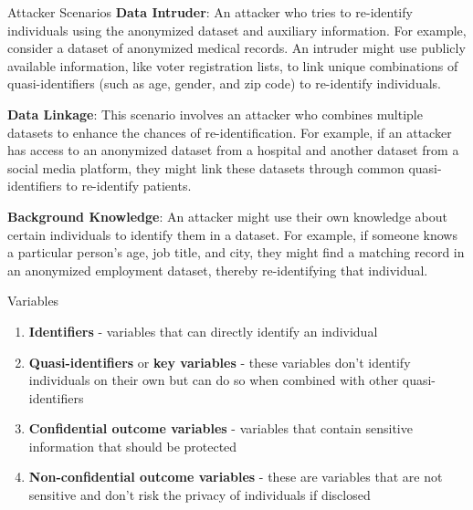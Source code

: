 \documentclass[
  ignorenonframetext,
  aspectratio=169,
]{beamer}
\begin{document}
\begin{frame}{Attacker Scenarios}
\label{attacker-scenarios}
\textbf{Data Intruder}: An attacker who tries to re-identify individuals
using the anonymized dataset and auxiliary information. For example,
consider a dataset of anonymized medical records. An intruder might use
publicly available information, like voter registration lists, to link
unique combinations of quasi-identifiers (such as age, gender, and zip
code) to re-identify individuals.

\textbf{Data Linkage}: This scenario involves an attacker who combines
multiple datasets to enhance the chances of re-identification. For
example, if an attacker has access to an anonymized dataset from a
hospital and another dataset from a social media platform, they might
link these datasets through common quasi-identifiers to re-identify
patients.

\textbf{Background Knowledge}: An attacker might use their own knowledge
about certain individuals to identify them in a dataset. For example, if
someone knows a particular person's age, job title, and city, they might
find a matching record in an anonymized employment dataset, thereby
re-identifying that individual.
\end{frame}

\begin{frame}{Variables}
\label{variables}
\begin{enumerate}
\item
  \textbf{Identifiers} - variables that can directly identify an
  individual
\item
  \textbf{Quasi-identifiers} or \textbf{key variables} - these variables
  don't identify individuals on their own but can do so when combined
  with other quasi-identifiers
\item
  \textbf{Confidential outcome variables} - variables that contain
  sensitive information that should be protected
\item
  \textbf{Non-confidential outcome variables} - these are variables that
  are not sensitive and don't risk the privacy of individuals if
  disclosed
\end{enumerate}
\end{frame}
\end{document}
